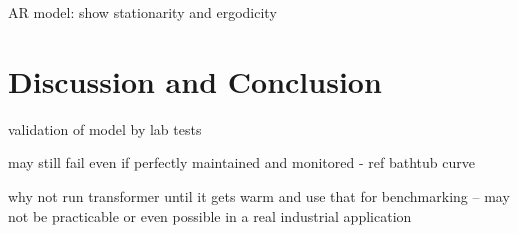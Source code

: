 \documentclass[]{article}
\begin{document}


AR model: show stationarity and ergodicity

\section{Discussion and Conclusion} \label{sec:conclusion}


validation of model by lab tests

may still fail even if perfectly maintained and monitored - ref bathtub curve

why not run transformer until it gets warm and use that for benchmarking -- may not be practicable or even possible in a real industrial application

\clearpage
\vspace{5mm}



\end{document}
